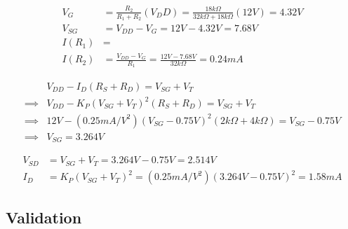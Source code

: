 \documentclass[12pt,letterpaper,titlepage]{article}
\begin{document}
\begin{raggedright}
\begin{align*}
   V_G
     &= \frac{R_2}{R_1 + R_2}(V_DD)
      = \frac{18k\Omega}{32k\Omega+18k\Omega}(12V)
      = 4.32V
\\ V_{SG}
     &= V_{DD} - V_G
      = 12V - 4.32V
      = 7.68V
\\ I(R_1) &=
\\ I(R_2)
	 &= \frac{V_{DD} - V_G}{R_1}
	  = \frac{12V - 7.68V}{32k\Omega}
	  = 0.24mA
\end{align*}

\clearpage
\begin{align*}
  & V_{DD} - I_D (R_S + R_D) = V_{SG} + V_T
\\\implies& V_{DD} - K_P(V_{SG}+V_T)^2 (R_S + R_D) = V_{SG} + V_T
\\\implies& 12V - (0.25 mA/V^2)(V_{SG} - 0.75V)^2 (2k\Omega + 4k\Omega) = V_{SG} - 0.75V
\\\implies& V_{SG} = 3.264V
\end{align*}

\begin{align*}
    V_{SD}
  	  &= V_{SG} + V_T
  	   = 3.264V - 0.75V
  	   = 2.514V
\\  I_D
      &= K_P(V_{SG} + V_T)^2
       = (0.25 mA/V^2)(3.264V-0.75V)^2
       = 1.58mA
\end{align*}



\subsection{Validation}


\end{raggedright}
\end{document}
